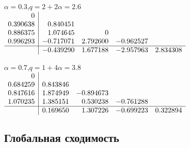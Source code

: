\documentclass[11pt,a4paper]{article}
\theoremstyle{plain}
\theoremstyle{definition}
\begin{document}
\begin{table}[ht]
\centering
\caption{Четырёхстадийные методы с показателем $q(4,\alpha)$ в виде таблиц Бутчера: в левом столбце узлы $c_i$, справа от черты матрица $A$, под чертой веса $b_j$. Значения округлены до шести знаков после запятой; с полной точностью коэффициенты приведены в файле \texttt{data/tab4.json} репозитория, и для воспроизведения порядков на мелких сетках следует использовать именно их.}\label{tab:coef}
{\footnotesize\setlength{\arraycolsep}{3pt}%
\begin{minipage}[t]{0.49\textwidth}\centering
$\alpha=0.3$,\quad $q=2+2\alpha=2.6$\\[4pt]
$\begin{array}{r|rrrr}
0 &  &  &  & \\
0.390638 & 0.840451 &  &  & \\
0.886375 & 1.074645 & 0 &  & \\
0.996293 & -0.717071 & 2.792600 & -0.962527 & \\
\hline
 & -0.439290 & 1.677188 & -2.957963 & 2.834308
\end{array}$
\end{minipage}\hfill
\begin{minipage}[t]{0.49\textwidth}\centering
$\alpha=0.7$,\quad $q=1+4\alpha=3.8$\\[4pt]
$\begin{array}{r|rrrr}
0 &  &  &  & \\
0.684259 & 0.843846 &  &  & \\
0.847616 & 1.874949 & -0.894673 &  & \\
1.070235 & 1.385151 & 0.530238 & -0.761288 & \\
\hline
 & 0.169650 & 1.307226 & -0.699223 & 0.322894
\end{array}$
\end{minipage}}
\end{table}

\subsection{Глобальная сходимость}\label{sec:global}
\end{document}
